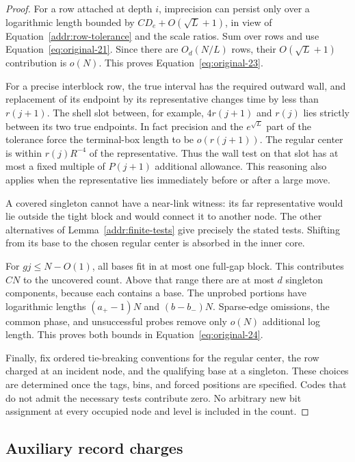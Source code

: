 \begin{proof}
For a row attached at depth $i$, imprecision can persist only over a
logarithmic length bounded by $C D_e+O(\sqrt L+1)$, in view of
Equation~\eqref{addr:row-tolerance} and the scale ratios.  Sum over
rows and use Equation~\eqref{eq:original-21}.  Since there are
$O_d(N/L)$ rows, their $O(\sqrt L+1)$ contribution is $o(N)$.
This proves Equation~\eqref{eq:original-23}.

For a precise interblock row, the true interval has the required
outward wall, and replacement of its endpoint by its representative
changes time by less than $r(j+1)$.  The shell slot between, for
example, $4r(j+1)$ and $r(j)$ lies strictly between its two true
endpoints.  In fact precision and the $e^{\sqrt L}$ part of the
tolerance force the terminal-box length to be $o(r(j+1))$.
The regular center is within $r(j)R^{-4}$ of the representative.
Thus the wall test on that slot has at most a fixed multiple of
$P(j+1)$ additional allowance.  This reasoning also applies when
the representative lies immediately before or after a large move.

A covered singleton cannot have a near-link witness: its far
representative would lie outside the tight block and would connect
it to another node.  The other alternatives of
Lemma~\ref{addr:finite-tests} give precisely the stated tests.
Shifting from its base to the chosen regular center is absorbed in
the inner core.

For $gj\le N-O(1)$, all bases fit in at most one full-gap block.
This contributes $CN$ to the uncovered count.  Above that range
there are at most $d$ singleton components, because each contains a
base.  The unprobed portions have logarithmic lengths
$(a_+-1)N$ and $(b-b_-)N$.  Sparse-edge omissions, the common phase,
and unsuccessful probes remove only $o(N)$ additional log length.
This proves both bounds in Equation~\eqref{eq:original-24}.

Finally, fix ordered tie-breaking conventions for the regular center,
the row charged at an incident node, and the qualifying base at a
singleton.  These choices are determined once the tags, bins, and
forced positions are specified.  Codes that do not admit the
necessary tests contribute zero.  No arbitrary new bit assignment
at every occupied node and level is included in the count.
\end{proof}

\subsection{Auxiliary record charges}

